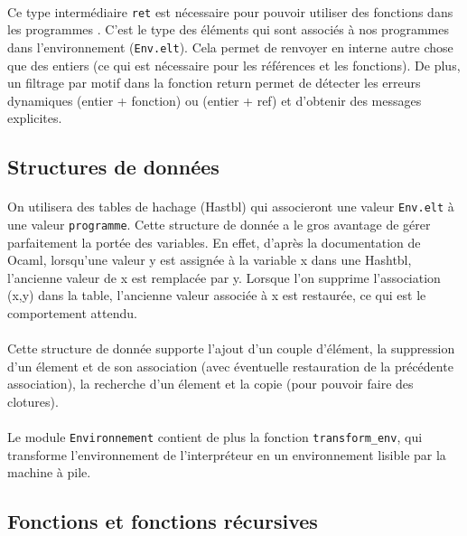 \paragraph{} Ce type intermédiaire \texttt{ret} est nécessaire pour pouvoir utiliser des fonctions dans les programmes \fouine. C'est le type des éléments qui sont associés à nos programmes dans l'environnement (\texttt{Env.elt}). Cela permet de renvoyer en interne autre chose que des entiers (ce qui est nécessaire pour les références et les fonctions). De plus, un filtrage par motif dans la fonction return permet de détecter les erreurs dynamiques (entier + fonction) ou (entier + ref) et d'obtenir des messages explicites.

\subsection{Structures de données}

\paragraph{} On utilisera des tables de hachage (Hastbl) qui associeront une valeur \texttt{Env.elt} à une valeur \texttt{programme}. Cette structure de donnée a le gros avantage de gérer parfaitement la portée des variables. En effet, d'après la documentation de Ocaml, lorsqu'une valeur y est assignée à la variable x dans une Hashtbl, l'ancienne valeur de x est remplacée par y. Lorsque l'on supprime l'association (x,y) dans la table, l'ancienne valeur associée à x est restaurée, ce qui est le comportement attendu.

\paragraph{} Cette structure de donnée supporte l'ajout d'un couple d'élément, la suppression d'un élement et de son association (avec éventuelle restauration de la précédente association), la recherche d'un élement et la copie (pour pouvoir faire des clotures).

\paragraph{} Le module \texttt{Environnement} contient de plus la fonction \texttt{transform\_env}, qui transforme l'environnement de l'interpréteur en un environnement lisible par la machine à pile.

\subsection{Fonctions et fonctions récursives}

